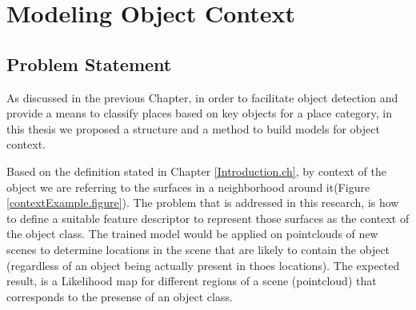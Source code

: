 \chapter{Modeling Object Context}
\label{ModelingObjectContext.ch}
\section{Problem Statement}
\label{ProblemStatement.sec}
As discussed in the previous Chapter, in order to facilitate object detection and provide a means to classify places based on key objects 
for a place category, in this thesis we proposed a structure and a method to build models for object context. 

Based on the definition stated in Chapter \ref{Introduction.ch}, by context of the object we are referring to the surfaces 
in a neighborhood around it(Figure \ref{contextExample.figure}). 
The problem that is addressed in this research, is how to define a suitable feature descriptor to represent those surfaces 
as the context of the object class. 
The trained model would be applied on pointclouds of new scenes to determine locations in the scene that are likely
to contain the object (regardless of an object being actually present in thoes locations).
The expected result, is a Likelihood map for different regions of a scene (pointcloud) that corresponds to the presense of an object class.





